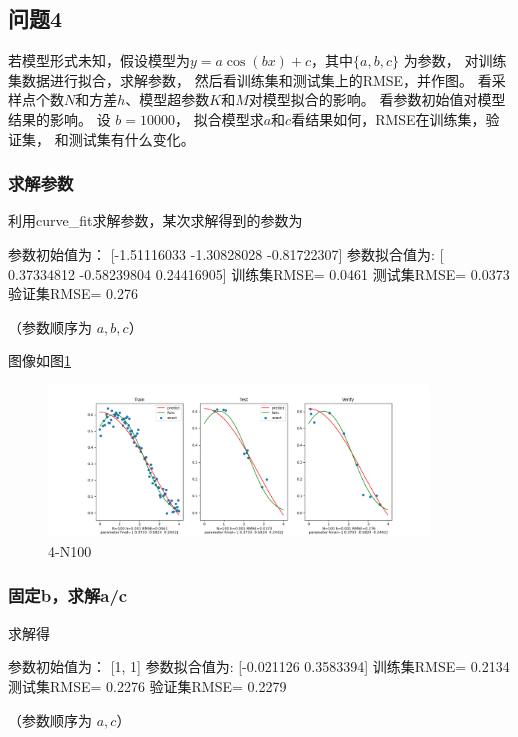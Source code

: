  \subsection{问题4}

 若模型形式未知，假设模型为$y=a \cos (bx) + c$，其中$\{a,b,c\}$ 为参数，
 对训练集数据进行拟合，求解参数，
 然后看训练集和测试集上的RMSE，并作图。
 看采样点个数$N$和方差$h$、模型超参数$K$和$M$对模型拟合的影响。
 看参数初始值对模型结果的影响。
 设 $b=10000$， 拟合模型求$a$和$c$看结果如何，RMSE在训练集，验证集， 和测试集有什么变化。
 
 \subsubsection{求解参数}
 利用curve\_fit求解参数，某次求解得到的参数为
 \begin{python}
参数初始值为： [-1.51116033 -1.30828028 -0.81722307]
参数拟合值为: [ 0.37334812 -0.58239804  0.24416905]
训练集RMSE= 0.0461
测试集RMSE= 0.0373
验证集RMSE= 0.276
 \end{python}
 （参数顺序为 $a,b,c$）

 图像如图\ref{fig:4-N100}
 \begin{figure}[H]
    \begin{center}
        \includegraphics[width=0.9\textwidth]{img/4-N100.png}
    \end{center}
   \caption[]{4-N100}
    \label{fig:4-N100}
\end{figure} 

\subsubsection{固定b，求解a/c}

求解得
\begin{python}
参数初始值为： [1, 1]
参数拟合值为: [-0.021126   0.3583394]
训练集RMSE= 0.2134
测试集RMSE= 0.2276
验证集RMSE= 0.2279

\end{python}
（参数顺序为 $a,c$）

